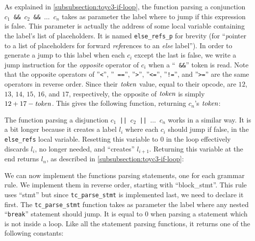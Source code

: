 As explained in \cref{subsubsection:toyc3-if-loop}, the function parsing a
conjunction {\tt $c_1$ \&\& $c_2$ \&\& $\ldots$ $c_n$} takes as parameter the
label where to jump if this expression is false. This parameter is actually the
address of some local variable containing the label's list of placeholders. It
is named {\tt else\_refs\_p} for brevity (for ``{\em p}ointer to a list of
placeholders for forward {\em ref}erences to an {\em else} label''). In order
to generate a jump to this label when each $c_i$ except the last is false, we
write a jump instruction for the {\em opposite} operator of $c_i$ when a ``{\tt
\&\&}'' token is read. Note that the opposite operators of ''{\tt <}'', ''{\tt
==}'', ''{\tt >}'', ''{\tt <=}'', ''{\tt !=}'', and ''{\tt >=}'' are the same
operators in reverse order. Since their $\it{token}$ value, equal to their
opcode, are $12$, $13$, $14$, $15$, $16$, and $17$, respectively, the opposite
of $\it{token}$ is simply $12+17-\it{token}$. This gives the following
function, returning $c_n$'s $\it{token}$:


The function parsing a disjunction {\tt $c_1$ || $c_2$ || $\ldots$ $c_n$} works
in a similar way. It is a bit longer because it creates a label $l_i$ where
each $c_i$ should jump if false, in the {\tt else\_refs} local variable.
Resetting this variable to 0 in the loop effectively discards $l_i$, no longer
needed, and ``creates'' $l_{i+1}$. Returning this variable at the end returns
$l_n$, as described in \cref{subsubsection:toyc3-if-loop}:


We can now implement the functions parsing statements, one for each grammar
rule. We implement them in reverse order, starting with ``block\_stmt''. This
rule uses ``stmt'' but since {\tt tc\_parse\_stmt} is implemented last, we need
to declare it first. The {\tt tc\_parse\_stmt} function takes as parameter the
label where any nested ``{\tt break}'' statement should jump. It is equal to 0
when parsing a statement which is not inside a loop. Like all the statement
parsing functions, it returns one of the following constants:

